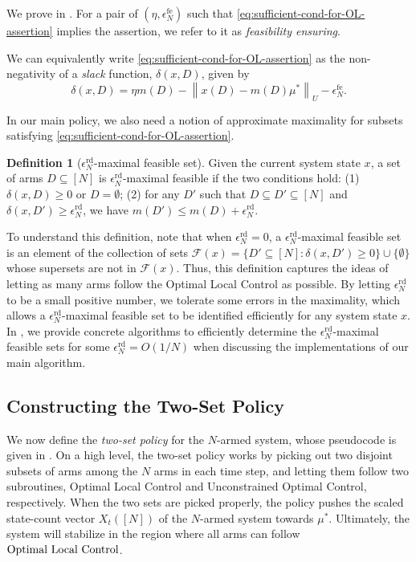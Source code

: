 \documentclass[11pt,letterpaper]{article}
\theoremstyle{plain}
\theoremstyle{definition}
\newtheorem{definition}{Definition}
\theoremstyle{remark}
\newcommand{\norm}[1]{\left\lVert#1\right\rVert}
\newcommand{\lppriority}{\textup{Optimal Local Control}}
\newcommand{\statdist}{\mu^*}
\newcommand{\umat}{U}
\newcommand{\errfe}{\epsilon_N^{\text{fe}}}
\newcommand{\errtol}{\epsilon_N^{\text{rd}}}
\newcommand{\slk}{\delta}
\newcommand{\slkb}{\delta}
\begin{document}
We prove  in . 
For a pair of $(\eta, \errfe)$ such that \eqref{eq:sufficient-cond-for-OL-assertion} implies the assertion, we refer to it as \emph{feasibility ensuring}. 


We can equivalently write \eqref{eq:sufficient-cond-for-OL-assertion} as the non-negativity of a \textit{slack} function, $\slk(x, D)$, given by
\begin{equation}
    \label{eq:slkb-def}
    \slkb(x, D) = \eta m(D) -  \norm{x(D) - m(D) \statdist}_{\umat}  - \errfe. 
\end{equation}

In our main policy, we also need a notion of approximate maximality for subsets satisfying \eqref{eq:sufficient-cond-for-OL-assertion}. 

\begin{definition}[$\errtol$-maximal feasible set]
    Given the current system state $x$, 
    a set of arms $D\subseteq[N]$ is $\errtol$-maximal feasible if the two conditions hold: 
    (1) $\slk(x, D)\geq 0$ or $D=\emptyset$; 
    (2) for any $D'$ such that $D \subseteq D'\subseteq [N]$ and $\slkb(x, D') \geq \errtol$, we have $m(D') \leq m(D) + \errtol$. 
\end{definition}


To understand this definition, note that when $\errtol = 0$,
a $\errtol$-maximal feasible set is an element of the collection of sets $\mathcal{F}(x) = \{D'\subseteq[N] \colon \slk(x, D') \geq 0\}\cup \{\emptyset\}$ whose supersets are not in $\mathcal{F}(x)$. 
Thus, this definition captures the ideas of letting as many arms follow the Optimal Local Control as possible.  
By letting $\errtol$ to be a small positive number, we tolerate some errors in the maximality, which allows a $\errtol$-maximal feasible set to be identified efficiently for any system state $x$. 
In , we provide concrete algorithms to efficiently determine the $\errtol$-maximal feasible sets for some $\errtol = O(1/N)$ when discussing the implementations of our main algorithm. 




\subsection{Constructing the Two-Set Policy}\label{sec:two-set}


We now define the \emph{two-set policy} for the $N$-armed system, whose pseudocode is given in . 
On a high level, the two-set policy works by picking out two disjoint subsets of arms among the $N$ arms in each time step, and letting them follow two subroutines, Optimal Local Control and Unconstrained Optimal Control, respectively. 
When the two sets are picked properly, the policy pushes the scaled state-count vector $X_t([N])$ of the $N$-armed system towards $\statdist$. Ultimately, the system will stabilize in the region where all arms can follow  $\lppriority$. 
\end{document}
